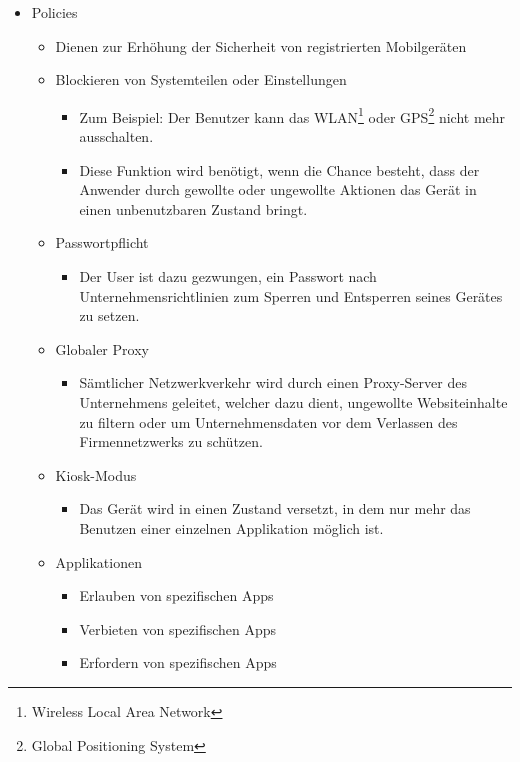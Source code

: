\begin{itemize}
	\item Policies
	\begin{itemize}
		\item Dienen zur Erhöhung der Sicherheit von registrierten Mobilgeräten
		\item Blockieren von Systemteilen oder Einstellungen
		\begin{itemize}
			\item Zum Beispiel: Der Benutzer kann das WLAN\footnote{Wireless Local Area Network} oder GPS\footnote{Global Positioning System} nicht mehr ausschalten.
			\item Diese Funktion wird benötigt, wenn die Chance besteht, dass der Anwender durch gewollte oder ungewollte Aktionen das Gerät in einen unbenutzbaren Zustand bringt.
		\end{itemize}
		\item Passwortpflicht
		\begin{itemize}
			\item Der User ist dazu gezwungen, ein Passwort nach Unternehmensrichtlinien zum Sperren und Entsperren seines Gerätes zu setzen.
		\end{itemize}
		\item Globaler Proxy
		\begin{itemize}
			\item Sämtlicher Netzwerkverkehr wird durch einen Proxy-Server des Unternehmens geleitet, welcher dazu dient, ungewollte Websiteinhalte zu filtern oder um Unternehmensdaten vor dem Verlassen des Firmennetzwerks zu schützen.
		\end{itemize}
		\item Kiosk-Modus
		\begin{itemize}
			\item Das Gerät wird in einen Zustand versetzt, in dem nur mehr das Benutzen einer einzelnen Applikation möglich ist.
		\end{itemize}
		\item Applikationen
		\begin{itemize}
			\item Erlauben von spezifischen Apps
			\item Verbieten von spezifischen Apps
			\item Erfordern von spezifischen Apps
		\end{itemize}
	\end{itemize}
\end{itemize}


